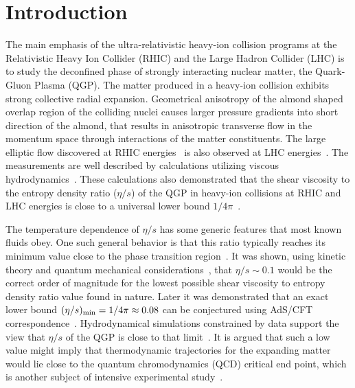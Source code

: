 
\section{Introduction}
\label{sec:intro}
The main emphasis of the ultra-relativistic heavy-ion collision programs at the Relativistic Heavy Ion Collider (RHIC) and the Large Hadron Collider (LHC) is to study the deconfined phase of strongly interacting nuclear matter, the Quark-Gluon Plasma (QGP). 
The matter produced in a heavy-ion collision exhibits strong collective radial expansion. 
Geometrical anisotropy of the almond shaped overlap region of the colliding nuclei causes larger pressure gradients into short direction of the almond,
that results in anisotropic transverse flow in the momentum space through interactions of the matter constituents.
The large elliptic flow discovered at RHIC energies~\cite{Ackermann:2000tr} is also observed at LHC energies~\cite{Aamodt:2010pa,Adam:2016izf,Aad:2014eoa}. The measurements are well described by calculations utilizing viscous hydrodynamics~\cite{Romatschke:2007mq,Shen:2011eg,Schenke:2011zz,Bozek:2012qs,Gale:2012rq,Hirano:2010je}.
These calculations also demonstrated that the shear viscosity to the entropy density ratio ($\eta/s$) of the QGP in heavy-ion collisions at RHIC and LHC energies is close to a universal lower bound $1/4\pi$~\cite{Kovtun:2004de}.

The temperature dependence of $\eta/s$ has some generic features that most known fluids obey. One such general behavior is that this ratio typically reaches its minimum value close to the phase transition region~\cite{Lacey:2006bc}. 
It was shown, using kinetic theory and quantum mechanical considerations~\cite{PhysRevD.31.53}, that $\eta/s\sim0.1$ would be the correct order of magnitude for the lowest possible shear viscosity to entropy density ratio value found in nature. Later it was demonstrated that an exact lower bound $(\eta/s)_{\rm min}=1/4\pi\approx0.08$ can be conjectured using AdS/CFT correspondence~\cite{Kovtun:2004de}. Hydrodynamical simulations constrained by data support the view that $\eta/s$ of the QGP is close to that limit~\cite{Gale:2012rq}.
It is argued that such a low value might imply that thermodynamic trajectories for the expanding matter would lie close to the quantum chromodynamics (QCD) critical end point, which is another subject of intensive experimental study~\cite{Lacey:2006bc,Csernai:2006zz}.

